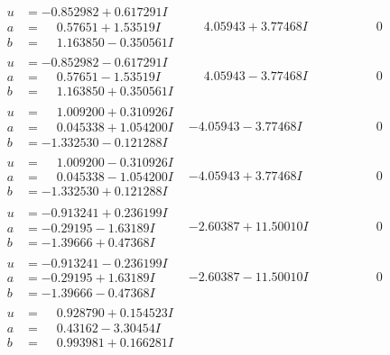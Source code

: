 \documentclass[1p]{elsarticle_modified}
\theoremstyle{definition}
\begin{document}
$$\begin{array}{c|c|c}
\begin{aligned}
u &= -0.852982 + 0.617291 I \\
a &= \phantom{-}0.57651 + 1.53519 I \\
b &= \phantom{-}1.163850 - 0.350561 I\end{aligned}
 & \phantom{-}4.05943 + 3.77468 I & \phantom{-0.000000 } 0 \\ \hline\begin{aligned}
u &= -0.852982 - 0.617291 I \\
a &= \phantom{-}0.57651 - 1.53519 I \\
b &= \phantom{-}1.163850 + 0.350561 I\end{aligned}
 & \phantom{-}4.05943 - 3.77468 I & \phantom{-0.000000 } 0 \\ \hline\begin{aligned}
u &= \phantom{-}1.009200 + 0.310926 I \\
a &= \phantom{-}0.045338 + 1.054200 I \\
b &= -1.332530 - 0.121288 I\end{aligned}
 & -4.05943 - 3.77468 I & \phantom{-0.000000 } 0 \\ \hline\begin{aligned}
u &= \phantom{-}1.009200 - 0.310926 I \\
a &= \phantom{-}0.045338 - 1.054200 I \\
b &= -1.332530 + 0.121288 I\end{aligned}
 & -4.05943 + 3.77468 I & \phantom{-0.000000 } 0 \\ \hline\begin{aligned}
u &= -0.913241 + 0.236199 I \\
a &= -0.29195 - 1.63189 I \\
b &= -1.39666 + 0.47368 I\end{aligned}
 & -2.60387 + 11.50010 I & \phantom{-0.000000 } 0 \\ \hline\begin{aligned}
u &= -0.913241 - 0.236199 I \\
a &= -0.29195 + 1.63189 I \\
b &= -1.39666 - 0.47368 I\end{aligned}
 & -2.60387 - 11.50010 I & \phantom{-0.000000 } 0 \\ \hline\begin{aligned}
u &= \phantom{-}0.928790 + 0.154523 I \\
a &= \phantom{-}0.43162 - 3.30454 I \\
b &= \phantom{-}0.993981 + 0.166281 I\end{aligned}

\end{array}$$
\end{document}
